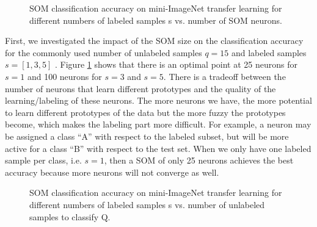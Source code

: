 \documentclass[runningheads]{llncs}
\begin{document}
\begin{table}[ht]
\centering
\caption{SOM training hyper-parameters.}
\label{tab_hyper-param}
\begin{center}
\end{center}
\end{table}

\begin{figure}[h!]
	\centerline{}
	\caption{SOM classification accuracy on mini-ImageNet transfer learning for different numbers of labeled samples s vs. number of SOM neurons.}
	\label{fig_wrnsom-neurons}
\end{figure}

First, we investigated the impact of the SOM size on the classification accuracy for the commonly used number of unlabeled samples $q = 15$ and labeled samples $s = [1, 3, 5]$ \cite{hu2020accurate_few_shot}. Figure \ref{fig_wrnsom-neurons} shows that there is an optimal point at 25 neurons for $s = 1$ and 100 neurons for $s = 3$ and $s = 5$. There is a tradeoff between the number of neurons that learn different prototypes and the quality of the learning/labeling of these neurons. The more neurons we have, the more potential to learn different prototypes of the data but the more fuzzy the prototypes become, which makes the labeling part more difficult. For example, a neuron may be assigned a class ``A'' with respect to the labeled subset, but will be more active for a class ``B'' with respect to the test set. When we only have one labeled sample per class, i.e. $s = 1$, then a SOM of only 25 neurons achieves the best accuracy because more neurons will not converge as well.

\begin{figure}[h!]
	\centerline{}
	\caption{SOM classification accuracy on mini-ImageNet transfer learning for different numbers of labeled samples s vs. number of unlabeled samples to classify Q.}
	\label{fig_wrnsom-data}
\end{figure}
\end{document}
